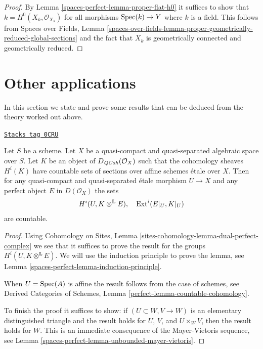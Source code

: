 \begin{proof}
By Lemma \ref{spaces-perfect-lemma-proper-flat-h0}
it suffices to show that $k = H^0(X_k, \mathcal{O}_{X_k})$
for all morphisms $\operatorname{Spec}(k) \to Y$ where $k$ is a field. This follows from
Spaces over Fields, Lemma
\ref{spaces-over-fields-lemma-proper-geometrically-reduced-global-sections}
and the fact that $X_k$ is geometrically connected and geometrically reduced.
\end{proof}

\section{Other applications}
\label{spaces-perfect-section-other-applications}
In this section we state and prove some results that can be deduced
from the theory worked out above.

\begin{lemma}
\label{spaces-perfect-lemma-countable-cohomology}
\href{https://stacks.math.columbia.edu/tag/0CRU}{\texttt{Stacks tag 0CRU}}

Let $S$ be a scheme. Let $X$ be a quasi-compact and quasi-separated
algebraic space over $S$. Let $K$ be an object of $D_{\mathit{QCoh}}(\mathcal{O}_X)$
such that the cohomology sheaves $H^i(K)$ have countable
sets of sections over affine schemes \'etale over $X$.
Then for any quasi-compact and quasi-separated \'etale morphism $U \to X$
and any perfect object $E$ in $D(\mathcal{O}_X)$
the sets
$$
H^i(U, K \otimes^\mathbf{L} E),\quad \operatorname{Ext}^i(E|_U, K|_U)
$$
are countable.
\end{lemma}

\begin{proof}
Using Cohomology on Sites, Lemma
\ref{sites-cohomology-lemma-dual-perfect-complex}
we see that it suffices to prove the result
for the groups $H^i(U, K \otimes^\mathbf{L} E)$.
We will use the induction principle to prove the lemma, see
Lemma \ref{spaces-perfect-lemma-induction-principle}.

\medskip\noindent
When $U = \operatorname{Spec}(A)$ is affine the result follows from
the case of schemes, see Derived Categories of Schemes,
Lemma \ref{perfect-lemma-countable-cohomology}.

\medskip\noindent
To finish the proof it suffices to show: if $(U \subset W, V \to W)$
is an elementary distinguished triangle
and the result holds for $U$, $V$, and $U \times_W V$, then
the result holds for $W$. This is an immediate consequence
of the Mayer-Vietoris sequence, see
Lemma \ref{spaces-perfect-lemma-unbounded-mayer-vietoris}.
\end{proof}

